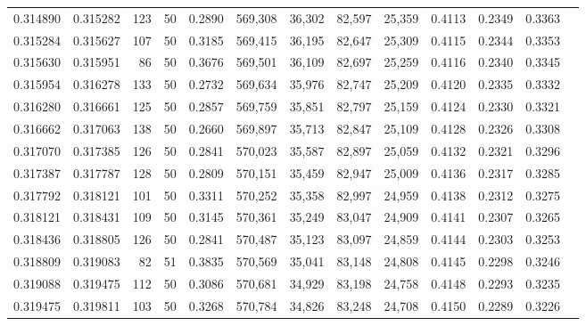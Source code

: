 \begin{tabular}{rrrrrrrrrrrrr}
0.314890 & 0.315282 &   123 &  50 &                                     0.2890 & 569,308 &  36,302 &  82,597 &  25,359 & 0.4113 & 0.2349 & 0.3363 \\
0.315284 & 0.315627 &   107 &  50 &                                     0.3185 & 569,415 &  36,195 &  82,647 &  25,309 & 0.4115 & 0.2344 & 0.3353 \\
0.315630 & 0.315951 &    86 &  50 &                                     0.3676 & 569,501 &  36,109 &  82,697 &  25,259 & 0.4116 & 0.2340 & 0.3345 \\
0.315954 & 0.316278 &   133 &  50 &                                     0.2732 & 569,634 &  35,976 &  82,747 &  25,209 & 0.4120 & 0.2335 & 0.3332 \\
0.316280 & 0.316661 &   125 &  50 &                                     0.2857 & 569,759 &  35,851 &  82,797 &  25,159 & 0.4124 & 0.2330 & 0.3321 \\
0.316662 & 0.317063 &   138 &  50 &                                     0.2660 & 569,897 &  35,713 &  82,847 &  25,109 & 0.4128 & 0.2326 & 0.3308 \\
0.317070 & 0.317385 &   126 &  50 &                                     0.2841 & 570,023 &  35,587 &  82,897 &  25,059 & 0.4132 & 0.2321 & 0.3296 \\
0.317387 & 0.317787 &   128 &  50 &                                     0.2809 & 570,151 &  35,459 &  82,947 &  25,009 & 0.4136 & 0.2317 & 0.3285 \\
0.317792 & 0.318121 &   101 &  50 &                                     0.3311 & 570,252 &  35,358 &  82,997 &  24,959 & 0.4138 & 0.2312 & 0.3275 \\
0.318121 & 0.318431 &   109 &  50 &                                     0.3145 & 570,361 &  35,249 &  83,047 &  24,909 & 0.4141 & 0.2307 & 0.3265 \\
0.318436 & 0.318805 &   126 &  50 &                                     0.2841 & 570,487 &  35,123 &  83,097 &  24,859 & 0.4144 & 0.2303 & 0.3253 \\
0.318809 & 0.319083 &    82 &  51 &                                     0.3835 & 570,569 &  35,041 &  83,148 &  24,808 & 0.4145 & 0.2298 & 0.3246 \\
0.319088 & 0.319475 &   112 &  50 &                                     0.3086 & 570,681 &  34,929 &  83,198 &  24,758 & 0.4148 & 0.2293 & 0.3235 \\
0.319475 & 0.319811 &   103 &  50 &                                     0.3268 & 570,784 &  34,826 &  83,248 &  24,708 & 0.4150 & 0.2289 & 0.3226 \\

\end{tabular}
